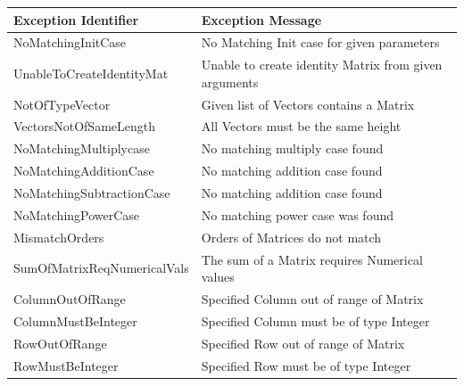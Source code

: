 \begin{flushleft}
                \begin{center}
                    \begin{tabular}{| L{5cm} | L{10cm} |}
                        \hline
                        Exception Identifier & Exception Message \\
                        \hline
                        \hline
                        NoMatchingInitCase & No Matching Init case for given parameters \\
                        \hline
                        UnableToCreateIdentityMat & Unable to create identity Matrix from given arguments \\
                        \hline
                        NotOfTypeVector & Given list of Vectors contains a Matrix \\
                        \hline
                        VectorsNotOfSameLength & All Vectors must be the same height \\
                        \hline
                        NoMatchingMultiplycase & No matching multiply case found \\
                        \hline
                        NoMatchingAdditionCase & No matching addition case found \\
                        \hline
                        NoMatchingSubtractionCase & No matching addition case found \\
                        \hline
                        NoMatchingPowerCase & No matching power case was found \\
                        \hline
                        MismatchOrders & Orders of Matrices do not match \\
                        \hline
                        SumOfMatrixReqNumericalVals & The sum of a Matrix requires Numerical values \\
                        \hline
                        ColumnOutOfRange & Specified Column out of range of Matrix \\
                        \hline
                        ColumnMustBeInteger & Specified Column must be of type Integer \\
                        \hline
                        RowOutOfRange & Specified Row out of range of Matrix \\
                        \hline
                        RowMustBeInteger & Specified Row must be of type Integer \\
                        \hline
                    \end{tabular}
                \end{center}
\end{flushleft}